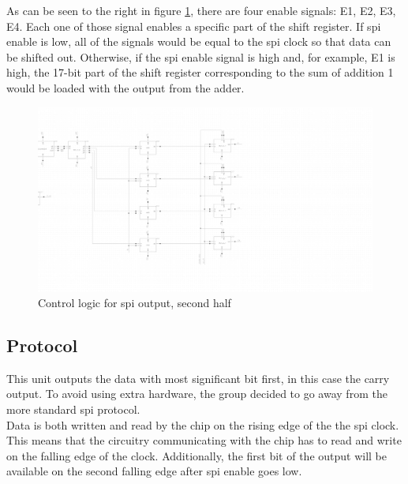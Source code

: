 \newpage
\raggedright As can be seen to the right in figure \ref{spi_out2}, there are four enable signals: E1, E2, E3, E4. Each one of those signal enables a specific part of the shift register. If spi enable is low, all of the signals would be equal to the spi clock so that data can be shifted out. Otherwise, if the spi enable signal is high and, for example, E1 is high, the 17-bit part of the shift register corresponding to the sum of addition 1 would be loaded with the output from the adder.
\begin{figure}[H]
\centering
\captionsetup{justification=centering}
\includegraphics[scale=0.3]{../figures/spi_out2.png}
\caption{Control logic for spi output, second half}
\label{spi_out2}
\end{figure}

\subsection{Protocol}
This unit outputs the data with most significant bit first, in this case the carry output. To avoid using extra hardware, the group decided to go away from the more standard spi protocol.  \\
Data is both written and read by the chip on the rising edge of the the spi clock. This means that the circuitry communicating with the chip has to read and write on the falling edge of the clock. Additionally, the first bit of the output will be available on the second falling edge after spi enable goes low.



